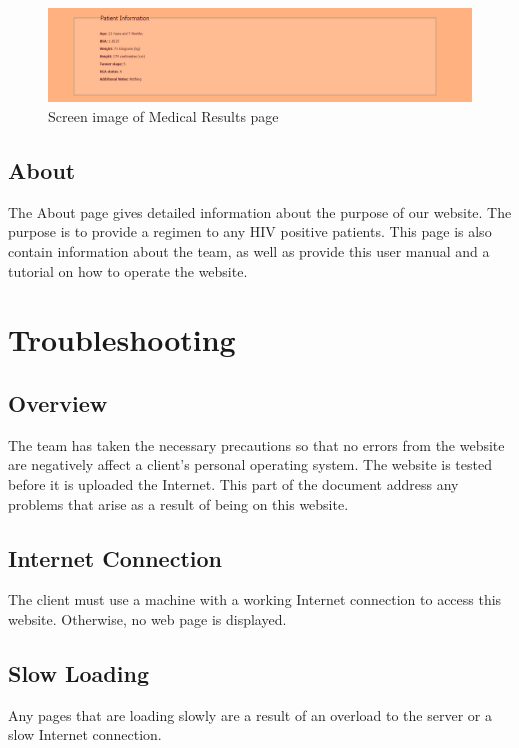 \documentclass[12pt]{article}
\begin{document}
\begin{figure}[H]
  \centering
  \includegraphics[width=\linewidth]{results1.png}
  \caption{Screen image of Medical Results page}
  \label{fig:results1}
\end{figure}

\subsection{About}
The About page gives detailed information about the purpose of our website. The purpose  is to provide a regimen to any HIV positive patients. This page is also contain information about the team, as well as provide this user manual and a tutorial on how to operate the website.

\section{Troubleshooting}
\subsection{Overview}
The team has taken the necessary precautions so that no errors from the website are negatively affect a client's personal operating system. The website is tested before it is uploaded the Internet. This part of the document address any problems that arise as a result of being on this website.

\subsection{Internet Connection}
The client must use a machine with a working Internet connection to access this website. Otherwise, no web page is displayed.

\subsection{Slow Loading}
Any pages that are loading slowly are a result of an overload to the server or a slow Internet connection.
\end{document}
